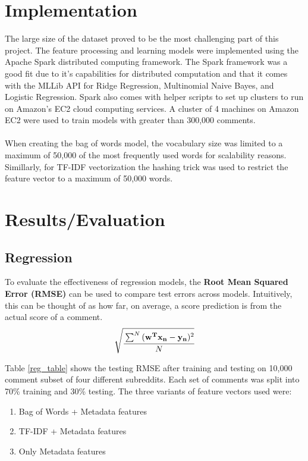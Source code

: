 \documentclass[11pt, twocolumn]{article}
\begin{document}
\section{Implementation}
	The large size of the dataset proved to be the most challenging part of this project. The feature processing and learning models were implemented using the Apache Spark \cite{spark} distributed computing framework. The Spark framework was a good fit due to it's capabilities for distributed computation and that it comes with the MLLib API for Ridge Regression, Multinomial Naive Bayes, and Logistic Regression. Spark also comes with helper scripts to set up clusters to run on Amazon's EC2 cloud computing services. A cluster of 4 machines on Amazon EC2 were used to train models with greater than 300,000 comments. \\
	\\
	When creating the bag of words model, the vocabulary size was limited to a maximum of 50,000 of the most frequently used words for scalability reasons. Simillarly, for TF-IDF vectorization the hashing trick \cite{hashing} was used to restrict the feature vector to a maximum of 50,000 words. 

\section{Results/Evaluation}

	\subsection{Regression}
	To evaluate the effectiveness of regression models, the \textbf{Root Mean Squared Error (RMSE)} can be used to compare test errors across models. Intuitively, this can be thought of as how far, on average, a score prediction is from the actual score of a comment.
	\begin{gather*}
		\sqrt{\cfrac{\sum^N{(\mathbf{w^T} \mathbf{x_n} - \mathbf{y_n})^2}}{N}}
	\end{gather*}
	
	Table \ref{reg_table} shows the testing RMSE after training and testing on 10,000 comment subset of four different subreddits. Each set of comments was split into 70\% training and 30\% testing. The three variants of feature vectors used were:
	\begin{enumerate}
		\setlength\itemsep{0em}
		\item Bag of Words + Metadata features
		\item TF-IDF + Metadata features
		\item Only Metadata features
	\end{enumerate}
	
\end{document}
